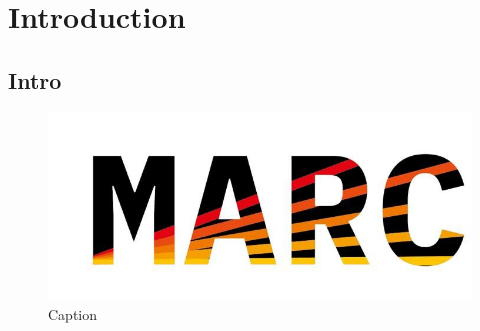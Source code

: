 \section{Introduction}

\subsection{Intro}

\begin{figure}[h]
    \centering 
    \includegraphics[width=\textwidth]{Figures/image.png}
    \caption{Caption}
    \label{fig:enter-label}
\end{figure}
